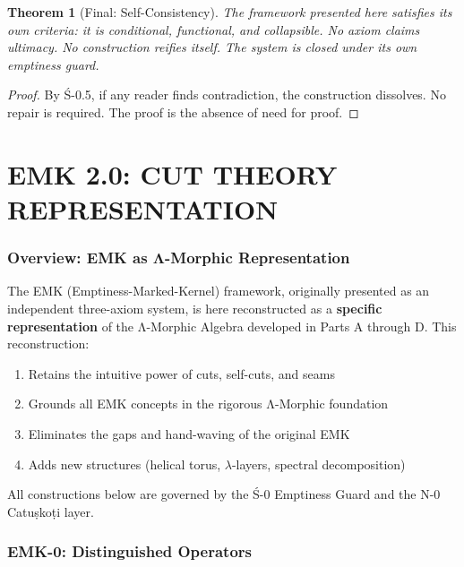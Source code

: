 \documentclass[12pt, oneside]{article}
\newtheorem{theorem}{Theorem}[section]
\begin{document}
\begin{theorem}[Final: Self-Consistency]
The framework presented here satisfies its own criteria: it is conditional, functional, and collapsible. No axiom claims ultimacy. No construction reifies itself. The system is closed under its own emptiness guard.
\end{theorem}

\begin{proof}
By Ś-0.5, if any reader finds contradiction, the construction dissolves. No repair is required. The proof is the absence of need for proof.
\end{proof}

\newpage
\part{EMK 2.0: CUT THEORY REPRESENTATION}

\section{Overview: EMK as Λ-Morphic Representation}

The EMK (Emptiness-Marked-Kernel) framework, originally presented as an independent three-axiom system, is here reconstructed as a \textbf{specific representation} of the Λ-Morphic Algebra developed in Parts A through D. This reconstruction:

\begin{enumerate}
    \item Retains the intuitive power of cuts, self-cuts, and seams
    \item Grounds all EMK concepts in the rigorous Λ-Morphic foundation
    \item Eliminates the gaps and hand-waving of the original EMK
    \item Adds new structures (helical torus, $\lambda$-layers, spectral decomposition)
\end{enumerate}

All constructions below are governed by the Ś-0 Emptiness Guard and the N-0 Catuṣkoṭi layer.

\section{EMK-0: Distinguished Operators}
\end{document}
